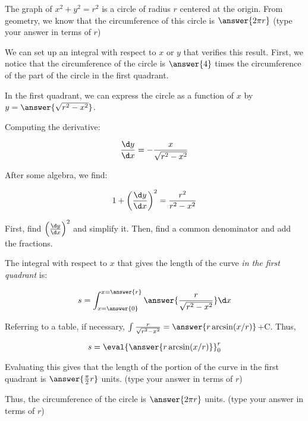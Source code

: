 \documentclass{ximera}
\author{Jim Talamo}
\begin{document}
\begin{exercise}

The graph of $x^2+y^2=r^2$ is a circle of radius $r$ centered at the origin.  From geometry, we know that the circumference of this circle is $\answer{2 \pi r}$ (type your answer in terms of $r$)

\begin{exercise}
We can set up an integral with respect to $x$ or $y$ that verifies this result.  First, we notice that the circumference of the circle is $\answer{4}$ times the circumference of the part of the circle in the first quadrant.

In the first quadrant, we can express the circle as a function of $x$ by $y=\answer{\sqrt{r^2-x^2}}$.

\begin{exercise}
Computing the derivative:

\[
\frac{\d y}{\d x} = -\frac{x}{\sqrt{r^2-x^2}}
\]

\begin{exercise}

After some algebra, we find:

\[
1+ \left(\frac{\d y}{\d x} \right)^2 = \frac{r^2}{r^2-x^2}
\]

\begin{hint}
First, find $\left(\frac{\d y}{\d x} \right)^2$ and simplify it.  Then, find a common denominator and add the fractions.
\end{hint}

\begin{exercise}

The integral with respect to $x$ that gives the length of the curve \emph{in the first quadrant} is:

\[
s= \int_{x=\answer{0}}^{x=\answer{r}} \answer{\frac{r}{\sqrt{r^2-x^2}}} \d x
\]

\begin{exercise}
Referring to a table, if necessary, $\int \frac{r}{\sqrt{r^2-x^2}} = \answer{r \arcsin(x/r)}$+C.  Thus,

\[
s= \eval{\answer{r \arcsin(x/r)}}_0^r
\]

Evaluating this gives that the length of the portion of the curve in the first quadrant is $\answer{\frac{\pi}{2}r}$ units. (type your answer in terms of $r$)

\begin{exercise}
Thus, the circumference of the circle is $\answer{2 \pi r}$ units. (type your answer in terms of $r$)

\end{exercise}

\end{exercise}
\end{exercise}
\end{exercise}
\end{exercise}
\end{exercise}
\end{exercise}
\end{document}
